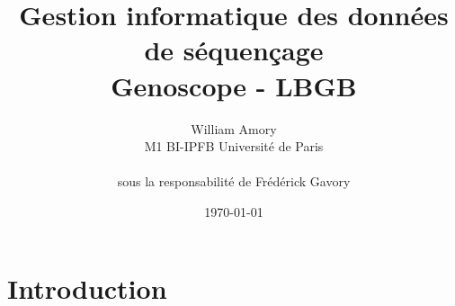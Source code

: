 \documentclass[12pt,a4paper]{article}
\title{Gestion informatique des données de séquençage \\ Genoscope - LBGB}
\author{William Amory \\ M1 BI-IPFB Université de Paris \\\\ sous la responsabilité de Frédérick Gavory}
\date{\today}
\begin{document}
\maketitle %
\section{Introduction} 








%
%
\end{document}
